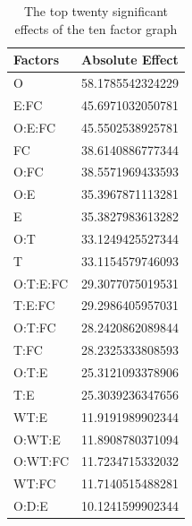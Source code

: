 \documentclass{llncs}
\begin{document}
\begin{table}
\begin{center}
    \begin{tabular}{ | l l |}
    \hline
    {\bf Factors} & {\bf Absolute Effect}  \\ \hline
      O & 58.1785542324229 \\ \hline
      E:FC & 45.6971032050781 \\ \hline
      O:E:FC & 45.5502538925781\\ \hline
      FC & 38.6140886777344\\ \hline
      O:FC & 38.5571969433593\\ \hline
      O:E & 35.3967871113281\\ \hline
      E & 35.3827983613282\\ \hline
      O:T & 33.1249425527344\\ \hline
      T & 33.1154579746093\\ \hline
      O:T:E:FC & 29.3077075019531\\ \hline
      T:E:FC & 29.2986405957031\\ \hline
      O:T:FC & 28.2420862089844\\ \hline
      T:FC & 28.2325333808593\\ \hline
      O:T:E & 25.3121093378906\\ \hline
      T:E & 25.3039236347656\\ \hline
      WT:E & 11.9191989902344\\ \hline
      O:WT:E & 11.8908780371094\\ \hline
      O:WT:FC & 11.7234715332032\\ \hline
      WT:FC & 11.7140515488281\\ \hline
      O:D:E & 10.1241599902344\\ \hline
    \end{tabular}
\end{center}
\caption{The top twenty significant effects of the ten factor graph}\label{10factorEffect}
\end{table}
\end{document}
